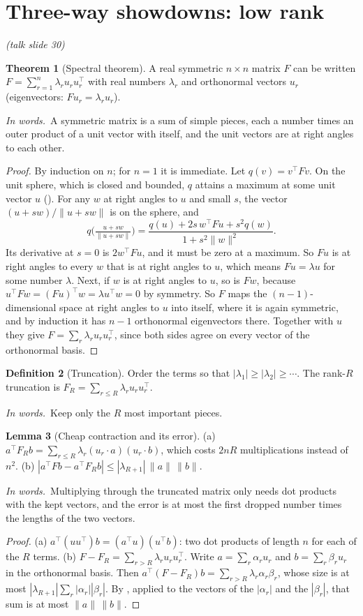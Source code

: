 \documentclass[11pt]{article}
\theoremstyle{definition}
\newtheorem{definition}{Definition}[section]
\newtheorem{lemma}[definition]{Lemma}
\newtheorem{theorem}[definition]{Theorem}
\newcommand{\inwords}{\par\smallskip\noindent\textit{In words.}\ }
\newcommand{\slide}[1]{\hfill{\small\itshape (talk slide #1)}}
\begin{document}
\section{Three-way showdowns: low rank}\label{sec:lowrank}\slide{30}
\begin{theorem}[Spectral theorem]\label{thm:spectral}
A real symmetric $n\times n$ matrix $F$ can be written $F=\sum_{r=1}^n\lambda_ru_ru_r^\top$ with real numbers $\lambda_r$ and
orthonormal vectors $u_r$ (eigenvectors: $Fu_r=\lambda_ru_r$).
\inwords A symmetric matrix is a sum of simple pieces, each a number times an outer product of a unit vector with itself,
and the unit vectors are at right angles to each other.
\end{theorem}
\begin{proof}
By induction on $n$; for $n=1$ it is immediate. Let $q(v)=v^\top Fv$. On the unit sphere, which is closed and bounded,
$q$ attains a maximum at some unit vector $u$ (). For any $w$ at right angles to $u$ and small $s$, the vector
$(u+sw)/\|u+sw\|$ is on the sphere, and
\[ q\Big(\tfrac{u+sw}{\|u+sw\|}\Big)=\frac{q(u)+2s\,w^\top Fu+s^2q(w)}{1+s^2\|w\|^2}. \]
Its derivative at $s=0$ is $2w^\top Fu$, and it must be zero at a maximum. So $Fu$ is at right angles to every $w$ that is at
right angles to $u$, which means $Fu=\lambda u$ for some number $\lambda$. Next, if $w$ is at right angles to $u$, so is $Fw$,
because $u^\top Fw=(Fu)^\top w=\lambda u^\top w=0$ by symmetry. So $F$ maps the $(n-1)$-dimensional space at right angles to $u$
into itself, where it is again symmetric, and by induction it has $n-1$ orthonormal eigenvectors there. Together with $u$
they give $F=\sum_r\lambda_ru_ru_r^\top$, since both sides agree on every vector of the orthonormal basis.
\end{proof}

\begin{definition}[Truncation]\label{def:trunc}
Order the terms so that $|\lambda_1|\ge|\lambda_2|\ge\cdots$. The rank-$R$ truncation is $F_R=\sum_{r\le R}\lambda_ru_ru_r^\top$.
\inwords Keep only the $R$ most important pieces.
\end{definition}

\begin{lemma}[Cheap contraction and its error]\label{lem:contract}
(a) $a^\top F_Rb=\sum_{r\le R}\lambda_r(u_r\cdot a)(u_r\cdot b)$, which costs $2nR$ multiplications instead of $n^2$.
(b) $|a^\top Fb-a^\top F_Rb|\le|\lambda_{R+1}|\,\|a\|\,\|b\|$.
\inwords Multiplying through the truncated matrix only needs dot products with the kept vectors, and the error is at
most the first dropped number times the lengths of the two vectors.
\end{lemma}
\begin{proof}
(a) $a^\top(uu^\top)b=(a^\top u)(u^\top b)$: two dot products of length $n$ for each of the $R$ terms.
(b) $F-F_R=\sum_{r>R}\lambda_ru_ru_r^\top$. Write $a=\sum_r\alpha_ru_r$ and $b=\sum_r\beta_ru_r$ in the orthonormal basis. Then
$a^\top(F-F_R)b=\sum_{r>R}\lambda_r\alpha_r\beta_r$, whose size is at most $|\lambda_{R+1}|\sum_r|\alpha_r||\beta_r|$. By , applied to the
vectors of the $|\alpha_r|$ and the $|\beta_r|$, that sum is at most $\|a\|\,\|b\|$.
\end{proof}
\end{document}

